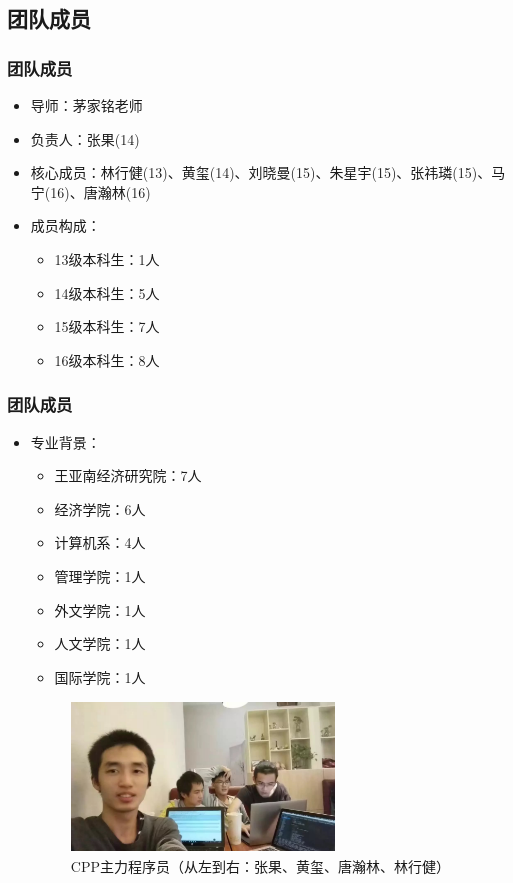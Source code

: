 \documentclass{beamer}
\begin{document}
\subsection{团队成员}
\begin{frame}[allowframebreaks]
\frametitle{团队成员}
\begin{itemize}
  \item 导师：茅家铭老师\footnotemark
  \item 负责人：张果(14)\footnotemark
  \item 核心成员：林行健(13)、黄玺(14)、刘晓曼(15)、朱星宇(15)、张祎璘(15)、马宁(16)、唐瀚林(16)
  \item 成员构成：
  \begin{itemize}
    \item 13级本科生：1人
    \item 14级本科生：5人
    \item 15级本科生：7人
    \item 16级本科生：8人
  \end{itemize}
  \end{itemize}
  \end{frame}
  
  \begin{frame}[allowframebreaks]
  \frametitle{团队成员}
  \begin{itemize}
  \item 专业背景：
  \begin{itemize}
    \item 王亚南经济研究院：7人
    \item 经济学院：6人
    \item 计算机系：4人
    \item 管理学院：1人
    \item 外文学院：1人
    \item 人文学院：1人
    \item 国际学院：1人
  \end{itemize} 
  \framebreak
  \begin{figure}
  \begin{center}
  \includegraphics[width=7cm,height=4cm]{cpp-coders.jpg} 
  \caption{CPP主力程序员（从左到右：张果、黄玺、唐瀚林、林行健）}
  \end{center}
  \end{figure}
\end{itemize}
\end{frame}
\end{document}
